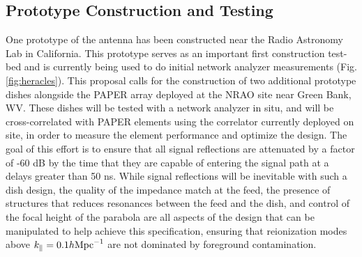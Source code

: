 \documentclass[preprint]{aastex}
\begin{document}
\vspace{-0.25in}
\subsection{Prototype Construction and Testing}
\vspace{-6pt}

One prototype of the antenna has been constructed near the Radio Astronomy Lab in California. 
This prototype serves as an important first construction test-bed and is currently being used to do 
initial network analyzer measurements (Fig. \ref{fig:heracles}).
This proposal calls for the construction of two additional prototype dishes alongside
the PAPER array deployed at the NRAO site near Green Bank, WV.
These dishes will be tested
with a network analyzer in situ, and will be cross-correlated with PAPER elements using
the correlator currently deployed on site, in order to measure
the element performance and optimize the design.  The goal of this effort is to ensure
that all signal reflections
are attenuated by a factor of -60 dB by the time that they are capable of entering the signal path
at a delays greater than 50 ns.  While signal reflections will be inevitable with such a dish
design, the quality of the impedance match at the feed,
the presence of structures that reduces resonances between
the feed and the dish, and control of the focal height of the parabola are all aspects
of the design that can
be manipulated to help achieve this specification, ensuring that reionization modes above
$k_\parallel=0.1h {\rm Mpc}^{-1}$ are not dominated by foreground contamination.
\end{document}
